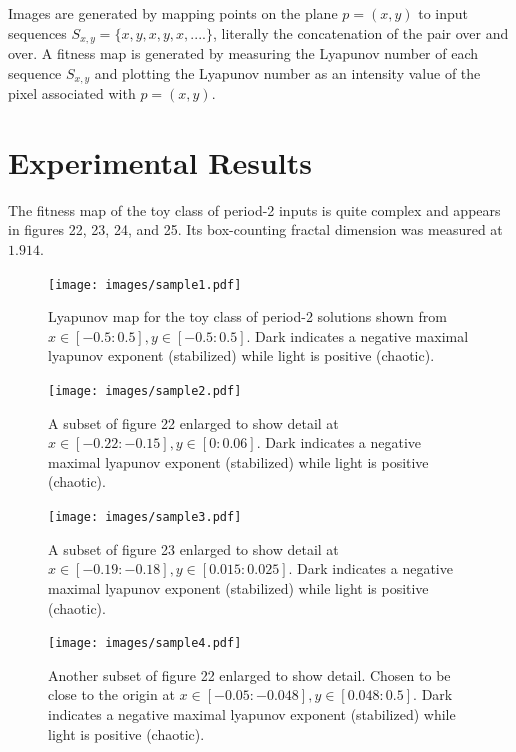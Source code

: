 \documentclass[12pt]{article}
\begin{document}
Images are generated by mapping points on the plane $p=(x,y)$ to input
sequences $S_{x,y} = \lbrace x, y, x, y, x, .... \rbrace$, literally the concatenation of the pair over and over.  A fitness map
is generated by measuring the Lyapunov number of each sequence $S_{x,y}$ and
plotting the Lyapunov number as an intensity value of the pixel associated
with $p=(x,y)$.

\section{Experimental Results}
The fitness map of the toy class of period-2 inputs is quite complex and appears in figures 22, 23, 24, and 25.  Its box-counting fractal dimension was measured at $1.914$.

\begin{figure}[htb]
\begin{center}
\texttt{[image: images/sample1.pdf]}
\caption{Lyapunov map for the toy class of period-2 solutions shown from $x\in[-0.5:0.5], y\in[-0.5:0.5]$.
Dark indicates a negative maximal lyapunov exponent (stabilized) while light is positive (chaotic).
}
\end{center}
\end{figure}

\begin{figure}[htb]
\begin{center}
\texttt{[image: images/sample2.pdf]}
\caption{A subset of figure 22 enlarged to show detail at $x\in[-0.22:-0.15], y\in[0:0.06]$.
Dark indicates a negative maximal lyapunov exponent (stabilized) while light is positive (chaotic).
}
\end{center}
\end{figure}

\begin{figure}[htb]
\begin{center}
\texttt{[image: images/sample3.pdf]}
\caption{A subset of figure 23 enlarged to show detail at $x\in[-0.19:-0.18], y\in[0.015:0.025]$.
Dark indicates a negative maximal lyapunov exponent (stabilized) while light is positive (chaotic).
}
\end{center}
\end{figure}

\begin{figure}[htb]
\begin{center}
\texttt{[image: images/sample4.pdf]}
\caption{Another subset of figure 22 enlarged to show detail.  Chosen to be close to the origin at $x\in[-0.05:-0.048], y\in[0.048:0.5]$.
Dark indicates a negative maximal lyapunov exponent (stabilized) while light is positive (chaotic).
}
\end{center}
\end{figure}
\end{document}
